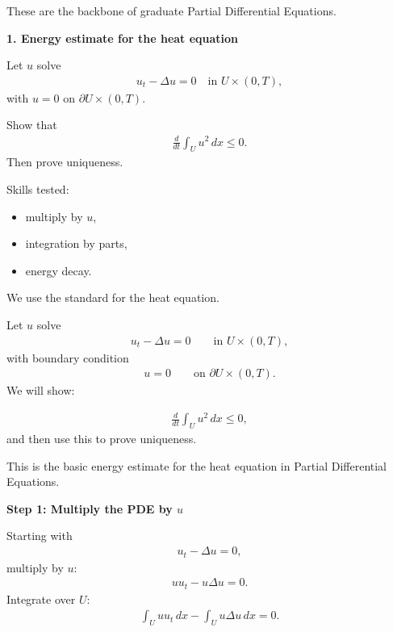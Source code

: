 \documentclass[12pt,a4paper]{report}
\begin{document}
These are the backbone of graduate Partial Differential Equations.
\begin{description}

\newpage\item \textbf{1. Energy estimate for the heat equation}

Let $u$ solve
\begin{align*}
u_t-\Delta u=0 \quad \text{in }U\times(0,T),
\end{align*}
with $u=0$ on $\partial U\times(0,T)$.

Show that
\begin{align*}
\frac{d}{dt}\int_U u^2\,dx\le 0.
\end{align*}
Then prove uniqueness.

Skills tested:

	\begin{itemize}
    \item multiply by $u$,
    \item integration by parts,
    \item energy decay.
	\end{itemize}

\HLINE


We use the standard  for the heat equation.

Let $u$ solve
\begin{align*}
u_t-\Delta u=0
\qquad\text{in }U\times(0,T),
\end{align*}
with boundary condition
\begin{align*}
u=0
\qquad\text{on }\partial U\times(0,T).
\end{align*}
We will show:

\begin{align*}
\frac{d}{dt}\int_U u^2\,dx\le 0,
\end{align*}
and then use this to prove uniqueness.

This is the basic energy estimate for the heat equation in Partial Differential Equations.

\begin{description}
\item \textbf{Step 1: Multiply the PDE by $u$}

Starting with
\begin{align*}
u_t-\Delta u=0,
\end{align*}
multiply by $u$:
\begin{align*}
uu_t-u\Delta u=0.
\end{align*}
Integrate over $U$:
\begin{align*}
\int_U uu_t\,dx-\int_U u\Delta u\,dx=0.
\end{align*}


\end{description}
\end{description}
\end{document}
